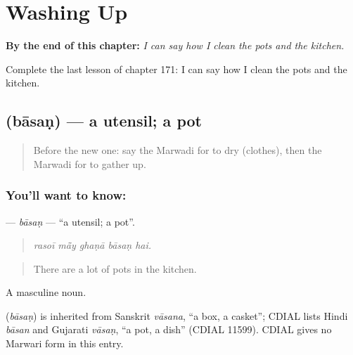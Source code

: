 
\chapter{Washing Up}
\label{ch:mw-washing-up}

\begin{chapteropening}
\textbf{By the end of this chapter:} \emph{I can say how I clean the pots and the kitchen.}

Complete the last lesson of chapter 171: I can say how I clean the pots and the kitchen.
\end{chapteropening}

\section[\texorpdfstring{\mw{बासण} (bāsaṇ)}{बासण (bāsaṇ)}]{ (bāsaṇ) — a utensil; a pot}

\label{lesson:MW-C171-basan}



\begin{quote}
Before the new one: say the Marwadi for to dry (clothes), then the Marwadi for to gather up.
\end{quote}

\subsection*{You'll want to know: }
\textbf{} — \emph{bāsaṇ} — \textquotedblleft{}a utensil; a pot\textquotedblright{}.

\begin{quote}
    
\end{quote}

\begin{quote}
\emph{rasoī mā̃y ghaṇā bāsaṇ hai.}
\end{quote}

\begin{quote}
There are a lot of pots in the kitchen.
\end{quote}

A masculine noun.

\begin{cousinweb}
\textbf{} (\emph{bāsaṇ}) is inherited from Sanskrit \emph{vāsana}, \textquotedblleft{}a box, a casket\textquotedblright{}; CDIAL lists Hindi \emph{bāsan} and Gujarati \emph{vāsaṇ}, \textquotedblleft{}a pot, a dish\textquotedblright{} (CDIAL 11599). CDIAL gives no Marwari form in this entry.
\end{cousinweb}

